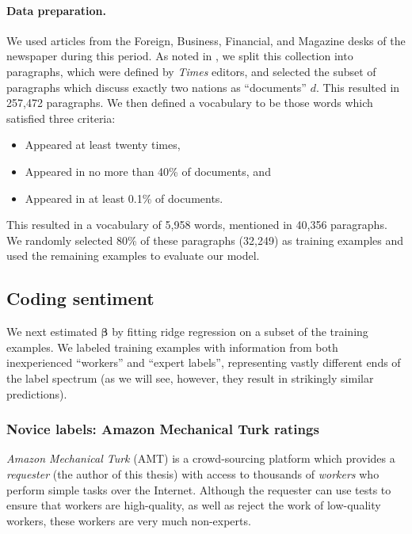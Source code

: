 \paragraph{Data preparation.}
We used articles from the Foreign, Business, Financial, and Magazine
desks of the newspaper during this period. As noted in
, we split this collection into paragraphs,
which were defined by \emph{Times} editors, and selected the subset of paragraphs
which discuss exactly two nations as ``documents'' $d$.  This resulted
in 257,472 paragraphs.  We then defined a vocabulary to be those words
which satisfied three criteria:
\begin{itemize}
  \item Appeared at least twenty times,
  \item Appeared in no more than 40\% of documents, and
  \item Appeared in at least 0.1\% of documents.
\end{itemize}
This resulted in a vocabulary of 5,958 words, mentioned in 40,356
paragraphs. We randomly selected 80\% of these paragraphs (32,249) as
training examples and used the remaining examples to evaluate our
model.

\subsection{Coding sentiment}
\label{section:sentiment_models}

We next estimated $\bm \beta$ by fitting ridge regression on a subset
of the training examples.  We labeled training examples with
information from both inexperienced ``workers'' and ``expert labels'',
representing vastly different ends of the label spectrum (as we will
see, however, they result in strikingly similar predictions).

\subsubsection{Novice labels: Amazon Mechanical Turk ratings}
\label{section:mturk}

\emph{Amazon Mechanical Turk} (AMT) is a crowd-sourcing platform which
provides a \emph{requester} (the author of this thesis) with access to
thousands of \emph{workers} who perform simple tasks over the
Internet.  Although the requester can use tests to ensure that workers
are high-quality, as well as reject the work of low-quality workers,
these workers are very much non-experts.

